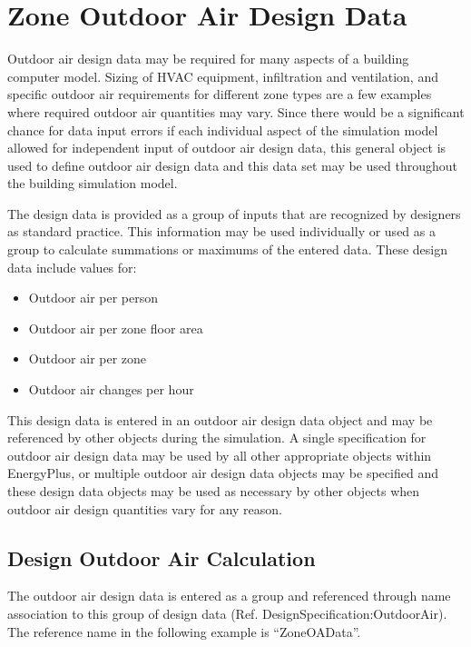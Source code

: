 \section{Zone Outdoor Air Design Data}\label{zone-outdoor-air-design-data}

Outdoor air design data may be required for many aspects of a building computer model. Sizing of HVAC equipment, infiltration and ventilation, and specific outdoor air requirements for different zone types are a few examples where required outdoor air quantities may vary. Since there would be a significant chance for data input errors if each individual aspect of the simulation model allowed for independent input of outdoor air design data, this general object is used to define outdoor air design data and this data set may be used throughout the building simulation model.

The design data is provided as a group of inputs that are recognized by designers as standard practice. This information may be used individually or used as a group to calculate summations or maximums of the entered data. These design data include values for:

\begin{itemize}
\tightlist
\item
  Outdoor air per person
\item
  Outdoor air per zone floor area
\item
  Outdoor air per zone
\item
  Outdoor air changes per hour
\end{itemize}

This design data is entered in an outdoor air design data object and may be referenced by other objects during the simulation. A single specification for outdoor air design data may be used by all other appropriate objects within EnergyPlus, or multiple outdoor air design data objects may be specified and these design data objects may be used as necessary by other objects when outdoor air design quantities vary for any reason.

\subsection{Design Outdoor Air Calculation}\label{design-outdoor-air-calculation}

The outdoor air design data is entered as a group and referenced through name association to this group of design data (Ref. DesignSpecification:OutdoorAir). The reference name in the following example is ``ZoneOAData''.

